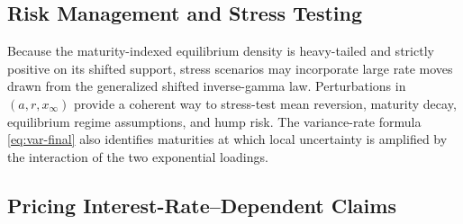 \documentclass[12pt]{article}
\theoremstyle{statementstyle}
\begin{document}
\subsection{Risk Management and Stress Testing}
\label{subsec:risk}

Because the maturity-indexed equilibrium density is heavy-tailed and
strictly positive on its shifted support, stress scenarios may
incorporate large rate moves drawn from the generalized shifted
inverse-gamma law. Perturbations in \((a,r,x_{\infty})\) provide a
coherent way to stress-test mean reversion, maturity decay, equilibrium
regime assumptions, and hump risk. The variance-rate formula
\eqref{eq:var-final} also identifies maturities at which local
uncertainty is amplified by the interaction of the two exponential
loadings.

\subsection{Pricing Interest-Rate--Dependent Claims}
\label{subsec:pricing}
\end{document}
